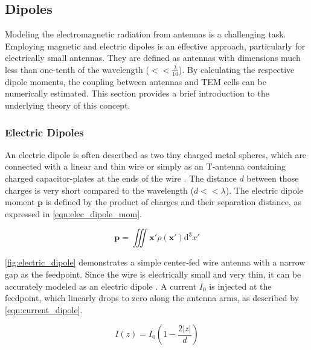 \subsection{Dipoles}
Modeling the electromagnetic radiation from antennas is a challenging task. Employing magnetic and electric dipoles is an effective approach, particularly for electrically small antennas. They are defined as antennas with dimensions much less than one-tenth of the wavelength ($<<\frac{\lambda}{10}$)\cite{Balanis_1997}. By calculating the respective dipole moments, the coupling between antennas and TEM cells can be numerically estimated. This section provides a brief introduction to the underlying theory of this concept.

\subsubsection{Electric Dipoles}
An electric dipole is often described as two tiny charged metal spheres, which are connected with a linear and thin wire \cite{Griffiths_2024} or simply as an T-antenna containing charged capacitor-plates at the ends of the wire \cite{Balanis_1997}. The distance $d$ between those charges is very short compared to the wavelength ($d << \lambda$).%
The electric dipole moment $\mathbf{p}$ is defined by the product of charges and their separation distance, as expressed in \autoref{eqn:elec_dipole_mom}\cite{Balanis_1997,Jackson}. %

\begin{equation}
    \mathbf{p} = \iiint\mathbf{x'} \rho (\mathbf{x'})\mathrm{d}^3x'
    \label{eqn:elec_dipole_mom}
\end{equation}

\autoref{fig:electric_dipole} demonstrates a simple center-fed wire antenna with a narrow gap as the feedpoint. Since the wire is electrically small and very thin, it can be accurately modeled as an electric dipole \cite{Griffiths_2024,Jackson}. A current $I_0$ is injected at the feedpoint, which linearly drops to zero along the antenna arms, as described by \autoref{eqn:current_dipole}\cite{Jackson}.

\begin{equation}
    I(z)= I_0\left( 1-\frac{2|z|}{d} \right)
    \label{eqn:current_dipole}
\end{equation}

